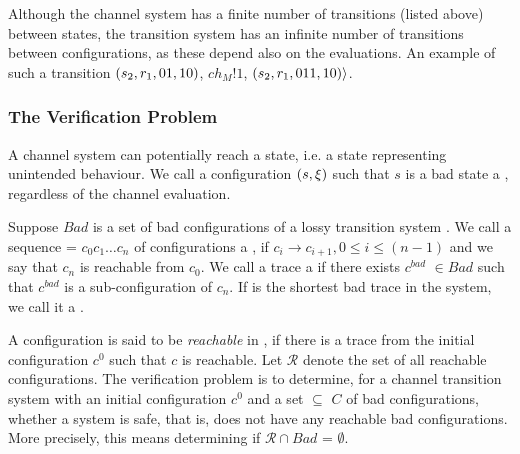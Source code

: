 Although the channel system has a finite number of transitions (listed above) between states, the transition system has an infinite number of transitions between configurations, as these depend also on the evaluations. An example of such a transition $(s_2,r_1,01,10)$, $ch_M!1$, $(s_2,r_1,011,10)\rangle$.

\subsubsection{The Verification Problem}
\label{badconf}
A channel system can potentially reach a  state, i.e. a state representing unintended behaviour. We call a configuration $(s, \xi)$ such that $s$ is a bad state a , regardless of the channel evaluation.

Suppose $Bad$ is a set of bad configurations of a lossy transition system . We call a sequence  = $c_0c_1\ldots c_n$ of configurations a , if $c_i \rightarrow c_{i+1}, 0 \leq i \leq (n-1)$ and we say that $c_n$ is reachable from $c_0$. We call a trace a  if there exists $c^{bad}$ $\in Bad$ such that $c^{bad}$ is a sub-configuration of $c_n$. If  is the shortest bad trace in the system, we call it a .

A configuration  is said to be \emph{reachable} in , if there is a trace from the initial configuration $c^0$ such that $c$ is reachable. Let $\mathcal{R}$ denote the set of all reachable configurations. The verification problem is to determine, for a channel transition system  with an initial configuration $c^0$ and a set  $\subseteq$ $C$ of bad configurations, whether a system is safe, that is, does not have any reachable bad configurations. More precisely, this means determining if $\mathcal{R} \cap Bad$ = $\emptyset$.

